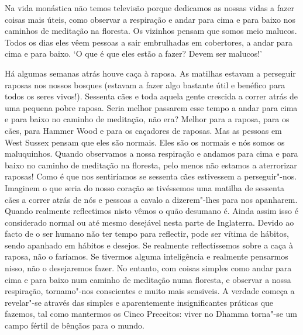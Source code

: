 Na vida monástica não temos televisão porque dedicamos as nossas vidas a
fazer coisas mais úteis, como observar a respiração e andar para cima e
para baixo nos caminhos de meditação na floresta. Os vizinhos pensam que
somos meio malucos. Todos os dias eles vêem pessoas a sair embrulhadas
em cobertores, a andar para cima e para baixo. `O que é que eles estão a
fazer? Devem ser malucos!'

Há algumas semanas atrás houve caça à raposa. As matilhas estavam a
perseguir raposas nos nossos bosques (estavam a fazer algo bastante útil
e benéfico para todos os seres vivos!). Sessenta cães e toda aquela
gente crescida a correr atrás de uma pequena pobre raposa. Seria melhor
passarem esse tempo a andar para cima e para baixo no caminho de
meditação, não era? Melhor para a raposa, para os cães, para Hammer Wood
e para os caçadores de raposas. Mas as pessoas em West Sussex pensam que
eles são normais. Eles são os normais e nós somos os maluquinhos. Quando
observamos a nossa respiração e andamos para cima e para baixo no
caminho de meditação na floresta, pelo menos não
estamos a aterrorizar raposas! Como é que nos sentiríamos se
sessenta cães estivessem a perseguir"-nos. Imaginem o que seria do nosso
coração se tivéssemos uma matilha de sessenta cães a correr atrás de nós
e pessoas a cavalo a dizerem"-lhes para nos apanharem. Quando realmente
reflectimos nisto vêmos o quão desumano é. Ainda assim isso é
considerado normal ou até mesmo desejável nesta parte de
Inglaterra. Devido ao facto de o ser humano não ter tempo para
reflectir, pode ser vítima de hábitos, sendo apanhado em hábitos e
desejos. Se realmente reflectíssemos sobre a caça à raposa, não o
faríamos. Se tivermos alguma inteligência e realmente pensarmos nisso,
não o desejaremos fazer. No entanto, com coisas simples como andar para
cima e para baixo num caminho de meditação numa floresta, e observar a
nossa respiração, tornamo"-nos conscientes e muito mais sensiveis. A
verdade começa a revelar"-se através das simples e aparentemente
insignificantes práticas que fazemos, tal como mantermos os Cinco
Preceitos: viver no Dhamma torna"-se um campo fértil de bênçãos para o mundo.

